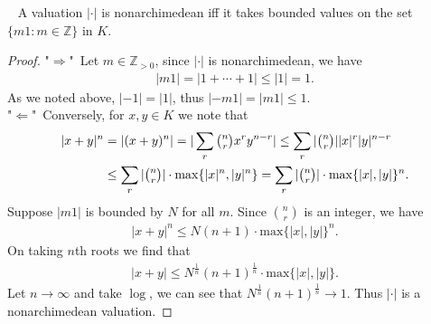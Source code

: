 \documentclass[12pt,a4paper,footinclude=true,headinclude=true]{scrbook} %
\newenvironment{proposition}[2][]
{\renewcommand\theinnercustomprop{#2}\innercustomprop[#1] 
\begin{mdframed}[backgroundcolor=gray!20]\ }
{\end{mdframed}\endinnercustomprop}
\begin{document}
\begin{proposition}{245}
    A valuation $|\cdot|$ is nonarchimedean iff it takes bounded values on the set  $\{m1:m\in\mathbb{Z}\}$ in $K$.
\end{proposition}
\begin{proof}
    "$\Rightarrow$"\ Let $m\in\mathbb{Z}_{>0}$, since $|\cdot|$ is nonarchimedean, we have
    \begin{align*}
        |m1|=|1+\cdots+1|\leq|1|=1.
    \end{align*}
    As we noted above, $|-1|=|1|$, thus $|-m1|=|m1|\leq1$.\\
    "$\Leftarrow$"\ Conversely, for $x,y\in K$ we note that
    \begin{align*}
        |x+y|^n &=|(x+y)^n|=|\sum_r\tbinom{n}{r}x^ry^{n-r}|\leq\sum_r|\tbinom{n}{r}||x|^r|y|^{n-r}\\ &\leq\sum_r|\tbinom{n}{r}|\cdot\mathrm{max}\{|x|^n,|y|^n\} =\sum_r|\tbinom{n}{r}|\cdot\mathrm{max}\{|x|,|y|\}^n.
    \end{align*}
    Suppose $|m1|$ is bounded by $N$ for all $m$. Since $\binom{n}{r}$ is an integer, we have
    \begin{align*}
        |x+y|^n\leq N(n+1)\cdot\mathrm{max}\{|x|,|y|\}^n.
    \end{align*}
    On taking $n$th roots we find that
    \begin{align*}
        |x+y|\leq N^{\frac{1}{n}}(n+1)^{\frac{1}{n}}\cdot\mathrm{max}\{|x|,|y|\}.
    \end{align*}
    Let $n\to\infty$ and take $\log$, we can see that $N^{\frac{1}{n}}(n+1)^{\frac{1}{n}}\to1$. Thus $|\cdot|$ is a nonarchimedean valuation.
\end{proof}
\end{document}
